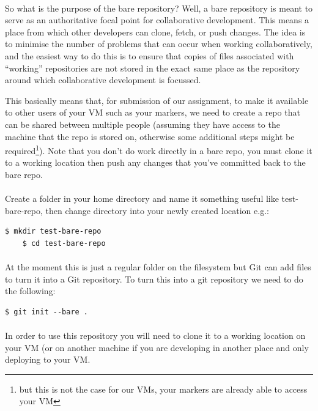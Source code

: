 \documentclass[12pt, a4paper, oneside]{book}
\begin{document}
{\paragraph{} So what is the purpose of the bare repository? Well, a bare repository is meant to serve as an authoritative focal point for collaborative development. This means a place from which other developers can clone, fetch, or push changes. The idea is to minimise the number of problems that can occur when working collaboratively, and the easiest way to do this is to ensure that copies of files associated with ``working'' repositories are not stored in the exact same place as the repository around which collaborative development is focussed.

This basically means that, for submission of our assignment, to make it available to other users of your VM such as your markers, we need to create a repo that can be shared between multiple people (assuming they have access to the machine that the repo is stored on, otherwise some additional steps might be required\footnote{but this is not the case for our VMs, your markers are already able to access your VM}). Note that you don't do work directly in a bare repo, you must clone it to a working location then push any changes that you've committed back to the bare repo.

\paragraph{} Create a folder in your home directory and name it something useful like test-bare-repo, then change directory into your newly created location e.g.:

\begin{lstlisting}[style=DOS]
    $ mkdir test-bare-repo
    $ cd test-bare-repo
\end{lstlisting}

\paragraph{} At the moment this is just a regular folder on the filesystem but Git can add files to turn it into a Git repository. To turn this into a git repository we need to do the following: 

\begin{lstlisting}[style=DOS]
    $ git init --bare .
\end{lstlisting}

\paragraph{} In order to use this repository you will need to clone it to a working location on your VM (or on another machine if you are developing in another place and only deploying to your VM.

}
\end{document}
